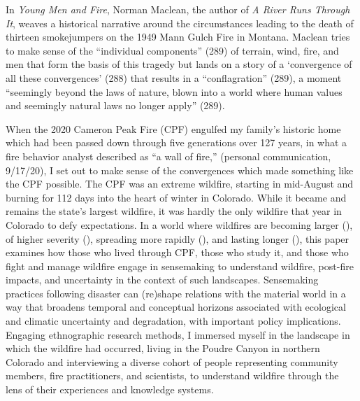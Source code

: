 \documentclass[
]{article}
\begin{document}
In \emph{Young Men and Fire}, Norman Maclean, the author of \emph{A River Runs Through It}, weaves a historical narrative around the circumstances leading to the death of thirteen smokejumpers on the 1949 Mann Gulch Fire in Montana. Maclean tries to make sense of the ``individual components'' (289) of terrain, wind, fire, and men that form the basis of this tragedy but lands on a story of a `convergence of all these convergences' (288) that results in a ``conflagration'' (289), a moment ``seemingly beyond the laws of nature, blown into a world where human values and seemingly natural laws no longer apply'' (289).

When the 2020 Cameron Peak Fire (CPF) engulfed my family's historic home which had been passed down through five generations over 127 years, in what a fire behavior analyst described as ``a wall of fire,'' (personal communication, 9/17/20), I set out to make sense of the convergences which made something like the CPF possible. The CPF was an extreme wildfire, starting in mid-August and burning for 112 days into the heart of winter in Colorado. While it became and remains the state's largest wildfire, it was hardly the only wildfire that year in Colorado to defy expectations. In a world where wildfires are becoming larger (), of higher severity (), spreading more rapidly (), and lasting longer (), this paper examines how those who lived through CPF, those who study it, and those who fight and manage wildfire engage in sensemaking to understand wildfire, post-fire impacts, and uncertainty in the context of such landscapes. Sensemaking practices following disaster can (re)shape relations with the material world in a way that broadens temporal and conceptual horizons associated with ecological and climatic uncertainty and degradation, with important policy implications. Engaging ethnographic research methods, I immersed myself in the landscape in which the wildfire had occurred, living in the Poudre Canyon in northern Colorado and interviewing a diverse cohort of people representing community members, fire practitioners, and scientists, to understand wildfire through the lens of their experiences and knowledge systems.
\end{document}
